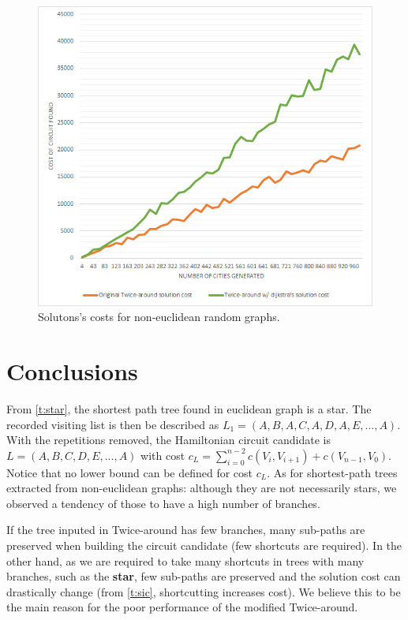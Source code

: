 \documentclass[journal]{IEEEtran}
\begin{document}
\begin{figure}[H]
	\centering
	\includegraphics[width=.95\linewidth]{comparison-ta-random-graphs}
	\caption{Solutons's costs for non-euclidean random graphs.}
	\label{fig:ctrg}
\end{figure}

\section{Conclusions}

From \ref{t:star}, the shortest path tree found in euclidean graph is a star. The recorded visiting list is then be described as $L_1=(A, B, A, C, A, D, A, E, ..., A)$. With the repetitions removed, the Hamiltonian circuit candidate is $L=(A,B,C, D, E, ..., A)$ with cost $c_L=\sum_{i=0}^{n-2} c(V_i, V_{i+1}) + c(V_{n-1}, V_0)$. Notice that no lower bound can be defined for cost $c_L$. As for shortest-path trees extracted from non-euclidean graphs: although they are not necessarily stars, we observed a tendency of those to have a high number of branches.

If the tree inputed in Twice-around has few branches, many sub-paths are preserved when building the circuit candidate (few shortcuts are required). In the other hand, as we are required to take many shortcuts in trees with many branches, such as the \textbf{star}, few sub-paths are preserved and the solution cost can drastically change (from \ref{t:sic}, shortcutting increases cost). We believe this to be the main reason for the poor performance of the modified Twice-around.



\end{document}
